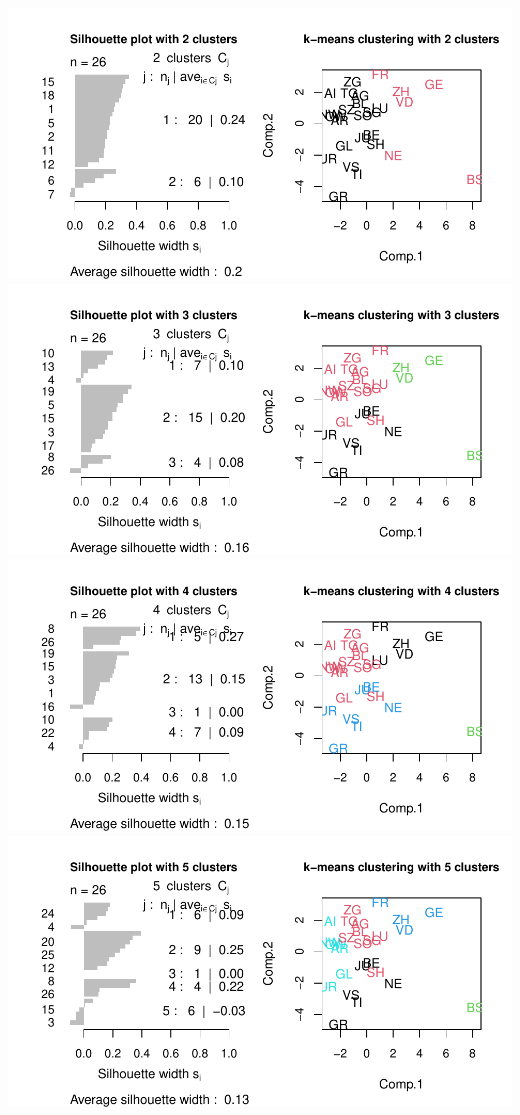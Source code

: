 \documentclass[
]{article}
\begin{document}
\includegraphics{Influence_factors_files/figure-latex/3.20_kmeans_cant-2.pdf}
\includegraphics{Influence_factors_files/figure-latex/3.20_kmeans_cant-3.pdf}
\includegraphics{Influence_factors_files/figure-latex/3.20_kmeans_cant-4.pdf}
\includegraphics{Influence_factors_files/figure-latex/3.20_kmeans_cant-5.pdf}
\end{document}
